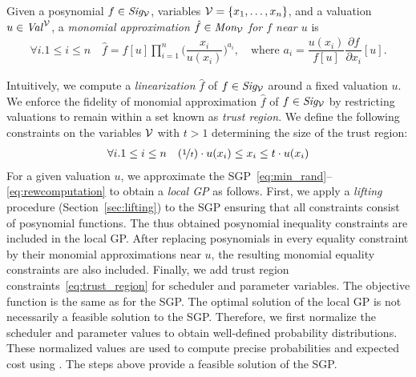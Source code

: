 %
\begin{definition}
Given a posynomial $f \in \signomis[\Var]$, variables $\Var = \{x_1,\dots,x_n\}$, and a valuation $u \in \valuations^\Var$, a \emph{monomial approximation $\hat f\in\monos[\Var]$ for $f$ near $u$} is 
\begin{align*}
	\forall i. 1 \leq i \leq n
	\quad
	\hat f = f[u]
	\prod_{i=1}^{n}\Bigg(\dfrac{x_{i}}{u(x_i)}\Bigg)^{a_{i}},
	\quad
	\text{where }
	a_{i}=\dfrac{u(x_i)}{f[u]}\dfrac{\partial f}{\partial x_{i}}[u].
\end{align*}	
\end{definition}
Intuitively, we compute a \emph{linearization} $\hat f$ of $f\in\signomis[\Var]$ around a fixed valuation $u$.
%
%
We enforce the fidelity of monomial approximation $\hat{f}$ of $f \in \signomis[\Var]$ by restricting valuations to remain within a set known as \emph{trust region}. We define the following constraints on the variables $\Var$ with $t > 1$ determining the size of the trust region:
\begin{align}
	\label{eq:trust_region}
	\forall i. 1 \leq i \leq n
	\quad (\nicefrac{1}{t})\cdot u(x_i) \leq x_i \leq t\cdot u(x_i)
\end{align}
% 
%
%
%
%
%
For a given valuation $u$, we approximate the SGP~\eqref{eq:min_rand}--\eqref{eq:rewcomputation} to obtain a \emph{local GP} as follows. %
First, we apply a \emph{lifting} procedure (Section~\ref{sec:lifting}) to the SGP ensuring that all constraints consist of posynomial functions. The thus obtained posynomial inequality constraints are included in the local GP.
After replacing posynomials in every equality constraint by their monomial approximations near $u$, the resulting monomial equality constraints are also included.
Finally, we add trust region constraints~\eqref{eq:trust_region} for scheduler and parameter variables. The objective function is the same as for the SGP.
The optimal solution of the local GP is not necessarily a feasible solution to the SGP. 
Therefore, we first normalize the scheduler and parameter values to obtain well-defined probability distributions. These normalized values are used to compute precise probabilities and expected cost using . The steps above provide a feasible solution of the SGP.

